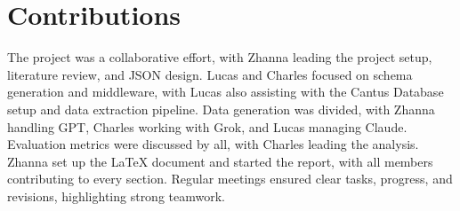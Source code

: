 \section{Contributions}

The project was a collaborative effort, with Zhanna leading the project setup, literature review, and JSON design. Lucas and Charles focused on schema generation and middleware, with Lucas also assisting with the Cantus Database setup and data extraction pipeline. Data generation was divided, with Zhanna handling GPT, Charles working with Grok, and Lucas managing Claude. Evaluation metrics were discussed by all, with Charles leading the analysis. Zhanna set up the LaTeX document and started the report, with all members contributing to every section. Regular meetings ensured clear tasks, progress, and revisions, highlighting strong teamwork.